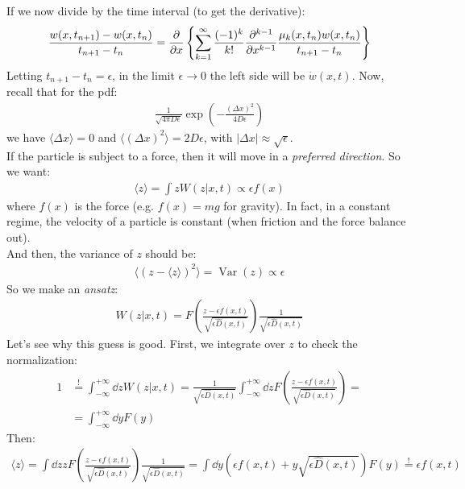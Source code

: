 \documentclass[../template.tex]{subfiles}
\begin{document}
If we now divide by the time interval (to get the derivative):
\begin{align*}
    \frac{w(x,t_{n+1})- w(x,t_n)}{t_{n+1}-t_n} = \pdv{x} \left\{
    \sum_{k=1}^\infty \frac{(-1)^k}{k!}  \pdv[k-1]{x} \frac{\mu_k(x,t_n) w(x,t_n)}{t_{n+1}-t_n} 
    \right\} 
\end{align*}
Letting $t_{n+1}-t_n=\epsilon$, in the limit $\epsilon \to 0$  the left side will be $\dot{w}(x,t)$. Now, recall that for the pdf:
\begin{align*}
    \frac{1}{\sqrt{4 \pi D \epsilon}} \exp\left(-\frac{(\Delta x)^2}{4 D \epsilon} \right)
\end{align*}
we have $\langle  \Delta x \rangle = 0$ and $\langle (\Delta x)^2 \rangle = 2 D \epsilon$, with $|\Delta x| \approx \sqrt{\epsilon}$.\\
If the particle is subject to a force, then it will move in a \textit{preferred direction}. So we want:
\begin{align*}
    \langle  z \rangle = \int z W(z|x,t) \propto \epsilon f(x)
\end{align*}   
where $f(x)$ is the force (e.g. $f(x) = mg$ for gravity). In fact, in a constant regime, the velocity of a particle is constant (when friction and the force balance out).\\
And then, the variance of $z$ should be:
\begin{align*}
    \langle (z- \langle  z \rangle)^2 \rangle = \operatorname{Var}(z) \propto \epsilon  
\end{align*}  
So we make an \textit{ansatz}:
\begin{align*}
    W(z|x,t) = F\left(\frac{z- \epsilon f(x,t)}{\sqrt{\epsilon \hat{D}(x,t)}} \right) \frac{1}{\sqrt{\epsilon\hat{D}(x,t) }} 
\end{align*} 
Let's see why this guess is good. First, we integrate over $z$ to check the normalization:
\begin{align*}
    1 &\overset{!}{=}  \int_{-\infty}^{+\infty} \dd{z} W(z| x,t) = \frac{1}{\sqrt{\epsilon \hat{D}(x,t)}} \int_{-\infty}^{+\infty} \dd{z} F\left(\frac{z-\epsilon f(x,t) }{\sqrt{\epsilon \hat{D}(x,t)}} \right) =\\
    &= \int_{-\infty}^{+\infty} \dd{y} F(y)
\end{align*}  
Then:
\begin{align*}
    \langle z \rangle = \int \dd{z} z F\left(\frac{z- \epsilon f(x,t)}{\sqrt{\epsilon\hat{D}(x,t) }} \right) \frac{1}{\sqrt{\epsilon \hat{D}(x,t )}} = \int \dd{y} (\epsilon f(x,t) + y\sqrt{\epsilon \hat{D} (x,t)}) F(y) \overset{!}{=}  \epsilon f(x,t)
\end{align*}
\end{document}
